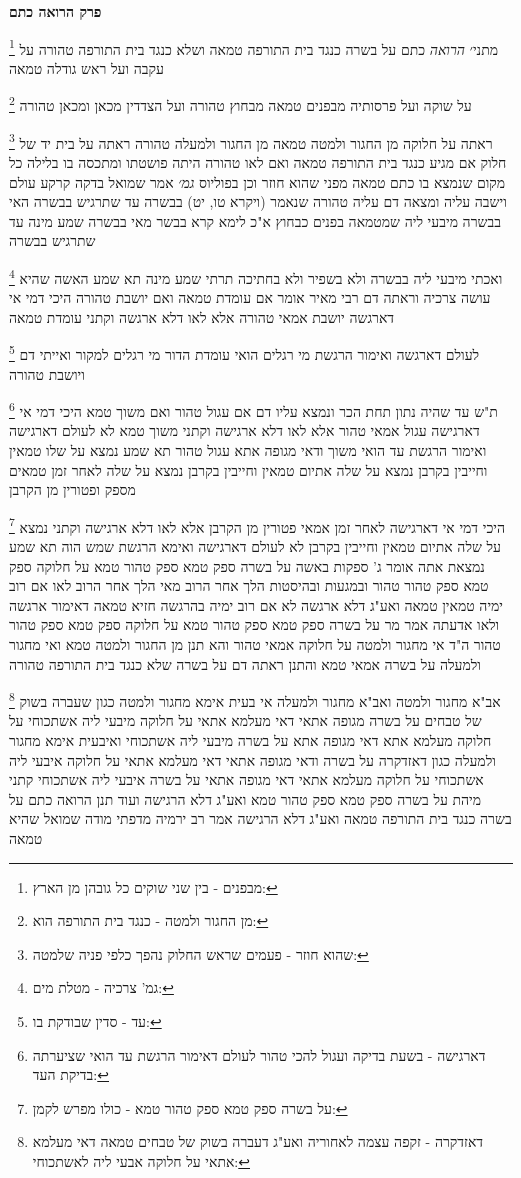 \documentclass[12pt, openany]{book}
\newcommand{\sethebfont}{
\fontsize{10.5pt}{21.0pt} \selectfont
}
\newcommand{\twocol}[1]{
	{\sethebfont \begin{multicols}{2}
			#1
	\end{multicols}}	
}
\newcommand{\chapname}{}
\newcommand{\newchap}[1]{
	\addcontentsline{toc}{chapter}{#1}
	\renewcommand{\chapname}{#1}
		\begin{center}
			\textbf{%
\fontsize{16pt}{16pt}\selectfont
				#1}
		\end{center}
}
\newcommand{\footnotecomment}[1]{
	\renewcommand\thefootnote{}
	\footnote{#1}}
\newcommand{\commenta}[1]{\footnotecomment{#1}}
\begin{document}
{\newchap{פרק  הרואה כתם}
\twocol{
\commenta{מבפנים - בין שני שוקים כל גובהן מן הארץ:}
מתני׳ {\large\emph{הרואה}} כתם על בשרה כנגד בית התורפה טמאה ושלא כנגד בית התורפה טהורה על עקבה ועל ראש גודלה טמאה
\commenta{מן החגור ולמטה - כנגד בית התורפה הוא:}
על שוקה ועל פרסותיה מבפנים טמאה מבחוץ טהורה ועל הצדדין מכאן ומכאן טהורה 
\commenta{שהוא חוזר - פעמים שראש החלוק נהפך כלפי פניה שלמטה:}
ראתה על חלוקה מן החגור ולמטה טמאה מן החגור ולמעלה טהורה ראתה על בית יד של חלוק אם מגיע כנגד בית התורפה טמאה ואם לאו טהורה 
היתה פושטתו ומתכסה בו בלילה כל מקום שנמצא בו כתם טמאה מפני שהוא חוזר וכן בפוליוס
{\large\emph{גמ׳}} אמר שמואל בדקה קרקע עולם וישבה עליה ומצאה דם עליה טהורה שנאמר (ויקרא טו, יט) בבשרה עד שתרגיש בבשרה 
האי בבשרה מיבעי ליה שמטמאה בפנים כבחוץ א"כ לימא קרא בבשר מאי בבשרה שמע מינה עד שתרגיש בבשרה 
\commenta{גמ' צרכיה - מטלת מים:}
ואכתי מיבעי ליה בבשרה ולא בשפיר ולא בחתיכה תרתי שמע מינה 
תא שמע האשה שהיא עושה צרכיה וראתה דם רבי מאיר אומר אם עומדת טמאה ואם יושבת טהורה 
היכי דמי אי דארגשה יושבת אמאי טהורה אלא לאו דלא ארגשה וקתני עומדת טמאה 
\commenta{עד - סדין שבודקת בו:}
לעולם דארגשה ואימור הרגשת מי רגלים הואי עומדת הדור מי רגלים למקור ואייתי דם ויושבת טהורה 
\commenta{דארגישה - בשעת בדיקה ועגול להכי טהור לעולם דאימור הרגשת עד הואי שציערתה בדיקת העד:}
ת"ש עד שהיה נתון תחת הכר ונמצא עליו דם אם עגול טהור ואם משוך טמא 
היכי דמי אי דארגישה עגול אמאי טהור אלא לאו דלא ארגישה וקתני משוך טמא 
לא לעולם דארגישה ואימור הרגשת עד הואי משוך ודאי מגופה אתא עגול טהור 
תא שמע נמצא על שלו טמאין וחייבין בקרבן נמצא על שלה אתיום טמאין וחייבין בקרבן נמצא על שלה לאחר זמן טמאים מספק ופטורין מן הקרבן 
\commenta{על בשרה ספק טמא ספק טהור טמא - כולו מפרש לקמן:}
היכי דמי אי דארגישה לאחר זמן אמאי פטורין מן הקרבן אלא לאו דלא ארגישה וקתני נמצא על שלה אתיום טמאין וחייבין בקרבן לא לעולם דארגישה ואימא הרגשת שמש הוה 
תא שמע נמצאת אתה אומר ג' ספקות באשה על בשרה ספק טמא ספק טהור טמא על חלוקה ספק טמא ספק טהור טהור ובמגעות ובהיסטות הלך אחר הרוב 
מאי הלך אחר הרוב לאו אם רוב ימיה טמאין טמאה ואע"ג דלא ארגשה 
לא אם רוב ימיה בהרגשה חזיא טמאה דאימור ארגשה ולאו אדעתה 
אמר מר על בשרה ספק טמא ספק טהור טמא על חלוקה ספק טמא ספק טהור טהור 
ה"ד אי מחגור ולמטה על חלוקה אמאי טהור והא תנן מן החגור ולמטה טמא ואי מחגור ולמעלה על בשרה אמאי טמא והתנן ראתה דם על בשרה שלא כנגד בית התורפה טהורה 
\commenta{דאזדקרה - זקפה עצמה לאחוריה ואע"ג דעברה בשוק של טבחים טמאה דאי מעלמא אתאי על חלוקה אבעי ליה לאשתכוחי:}
אב"א מחגור ולמטה ואב"א מחגור ולמעלה אי בעית אימא מחגור ולמטה כגון שעברה בשוק של טבחים על בשרה מגופה אתאי דאי מעלמא אתאי על חלוקה מיבעי ליה אשתכוחי על חלוקה מעלמא אתא דאי מגופה אתא על בשרה מיבעי ליה אשתכוחי 
ואיבעית אימא מחגור ולמעלה כגון דאזדקרה על בשרה ודאי מגופה אתאי דאי מעלמא אתאי על חלוקה איבעי ליה אשתכוחי על חלוקה מעלמא אתאי דאי מגופה אתאי על בשרה איבעי ליה אשתכוחי 
קתני מיהת על בשרה ספק טמא ספק טהור טמא ואע"ג דלא הרגישה ועוד תנן הרואה כתם על בשרה כנגד בית התורפה טמאה ואע"ג דלא הרגישה אמר רב ירמיה מדפתי מודה שמואל שהיא טמאה
\clearpage}

}
\end{document}
